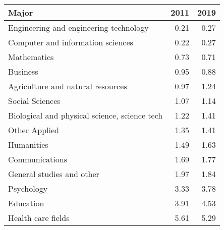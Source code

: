 \begin{tabular}{lrr}
\hline
 Major                                         &   2011 &   2019 \\
\hline
 Engineering and engineering technology        &   0.21 &   0.27 \\
 Computer and information sciences             &   0.22 &   0.27 \\
 Mathematics                                   &   0.73 &   0.71 \\
 Business                                      &   0.95 &   0.88 \\
 Agriculture and natural resources             &   0.97 &   1.24 \\
 Social Sciences                               &   1.07 &   1.14 \\
 Biological and physical science, science tech &   1.22 &   1.41 \\
 Other Applied                                 &   1.35 &   1.41 \\
 Humanities                                    &   1.49 &   1.63 \\
 Communications                                &   1.69 &   1.77 \\
 General studies and other                     &   1.97 &   1.84 \\
 Psychology                                    &   3.33 &   3.78 \\
 Education                                     &   3.91 &   4.53 \\
 Health care fields                            &   5.61 &   5.29 \\
\hline
\end{tabular}
